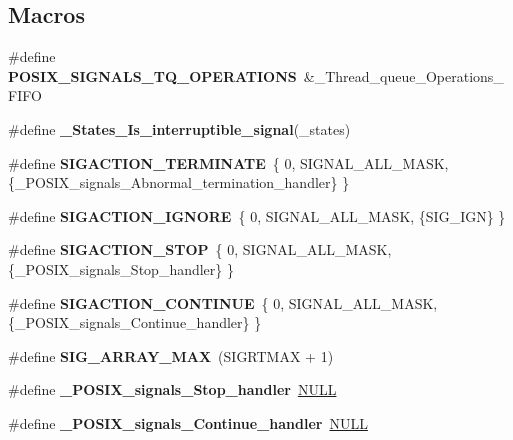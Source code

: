 \subsection*{Macros}
\begin{DoxyCompactItemize}
\item 
\mbox{\label{group__POSIX__SIGNALS_ga5efba8101e72180914d96245fd0cacb5}} 
\#define {\bfseries P\+O\+S\+I\+X\+\_\+\+S\+I\+G\+N\+A\+L\+S\+\_\+\+T\+Q\+\_\+\+O\+P\+E\+R\+A\+T\+I\+O\+NS}~\&\+\_\+\+Thread\+\_\+queue\+\_\+\+Operations\+\_\+\+F\+I\+FO
\item 
\#define {\bfseries \+\_\+\+States\+\_\+\+Is\+\_\+interruptible\+\_\+signal}(\+\_\+states)
\item 
\mbox{\label{group__POSIX__SIGNALS_ga8f6da91d90365e6a168162bdc3eb09a6}} 
\#define {\bfseries S\+I\+G\+A\+C\+T\+I\+O\+N\+\_\+\+T\+E\+R\+M\+I\+N\+A\+TE}~\{ 0, S\+I\+G\+N\+A\+L\+\_\+\+A\+L\+L\+\_\+\+M\+A\+SK, \{\+\_\+\+P\+O\+S\+I\+X\+\_\+signals\+\_\+\+Abnormal\+\_\+termination\+\_\+handler\} \}
\item 
\mbox{\label{group__POSIX__SIGNALS_ga78ba57e0df0fd9abdc166008054f0b57}} 
\#define {\bfseries S\+I\+G\+A\+C\+T\+I\+O\+N\+\_\+\+I\+G\+N\+O\+RE}~\{ 0, S\+I\+G\+N\+A\+L\+\_\+\+A\+L\+L\+\_\+\+M\+A\+SK, \{S\+I\+G\+\_\+\+I\+GN\} \}
\item 
\mbox{\label{group__POSIX__SIGNALS_gae93e5b9a1b7244aa84bd49188994a470}} 
\#define {\bfseries S\+I\+G\+A\+C\+T\+I\+O\+N\+\_\+\+S\+T\+OP}~\{ 0, S\+I\+G\+N\+A\+L\+\_\+\+A\+L\+L\+\_\+\+M\+A\+SK, \{\+\_\+\+P\+O\+S\+I\+X\+\_\+signals\+\_\+\+Stop\+\_\+handler\} \}
\item 
\mbox{\label{group__POSIX__SIGNALS_gaffd4cf06c8bdab6a6ce50ed7479baed6}} 
\#define {\bfseries S\+I\+G\+A\+C\+T\+I\+O\+N\+\_\+\+C\+O\+N\+T\+I\+N\+UE}~\{ 0, S\+I\+G\+N\+A\+L\+\_\+\+A\+L\+L\+\_\+\+M\+A\+SK, \{\+\_\+\+P\+O\+S\+I\+X\+\_\+signals\+\_\+\+Continue\+\_\+handler\} \}
\item 
\mbox{\label{group__POSIX__SIGNALS_ga5d111235e2ebc8906c354e9e81d82c9e}} 
\#define {\bfseries S\+I\+G\+\_\+\+A\+R\+R\+A\+Y\+\_\+\+M\+AX}~(S\+I\+G\+R\+T\+M\+AX + 1)
\item 
\mbox{\label{group__POSIX__SIGNALS_gaeb222d23e716781127508ef8e05507f7}} 
\#define {\bfseries \+\_\+\+P\+O\+S\+I\+X\+\_\+signals\+\_\+\+Stop\+\_\+handler}~\mbox{\hyperlink{bestcomm__api_8h_a872bb74de61c3689ccd5b41873fce42c}{N\+U\+LL}}
\item 
\mbox{\label{group__POSIX__SIGNALS_gad0a6b701f1f37d96a305540ccb2632bb}} 
\#define {\bfseries \+\_\+\+P\+O\+S\+I\+X\+\_\+signals\+\_\+\+Continue\+\_\+handler}~\mbox{\hyperlink{bestcomm__api_8h_a872bb74de61c3689ccd5b41873fce42c}{N\+U\+LL}}
\end{DoxyCompactItemize}
